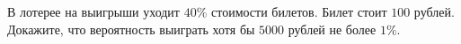 В лотерее на выигрыши уходит $40 \%$ стоимости билетов. Билет стоит $100$ рублей. Докажите, что
вероятность выиграть хотя бы $5000$ рублей не более $1 \%$.
